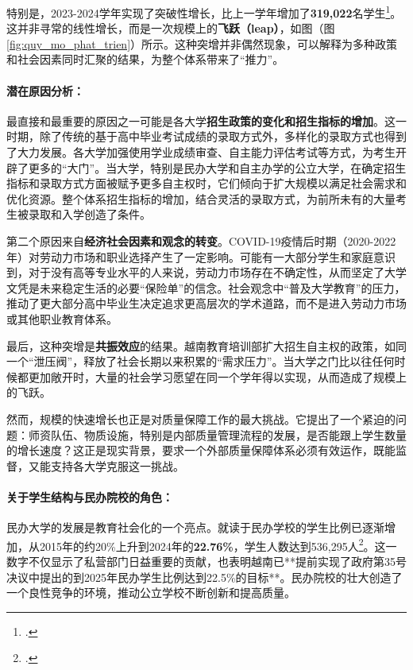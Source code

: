 特别是，2023-2024学年实现了突破性增长，比上一学年增加了\textbf{319,022}名学生\footcite{stat_moet_2024}。这并非寻常的线性增长，而是一次规模上的\textbf{飞跃（leap）}，如图（图\ref{fig:quy_mo_phat_trien}）所示。这种突增并非偶然现象，可以解释为多种政策和社会因素同时汇聚的结果，为整个体系带来了“推力”。

\paragraph{潜在原因分析：}
最直接和最重要的原因之一可能是各大学\textbf{招生政策的变化和招生指标的增加}。这一时期，除了传统的基于高中毕业考试成绩的录取方式外，多样化的录取方式也得到了大力发展。各大学加强使用学业成绩审查、自主能力评估考试等方式，为考生开辟了更多的“大门”。当大学，特别是民办大学和自主办学的公立大学，在确定招生指标和录取方式方面被赋予更多自主权时，它们倾向于扩大规模以满足社会需求和优化资源。整个体系招生指标的增加，结合灵活的录取方式，为前所未有的大量考生被录取和入学创造了条件。

第二个原因来自\textbf{经济社会因素和观念的转变}。COVID-19疫情后时期（2020-2022年）对劳动力市场和职业选择产生了一定影响。可能有一大部分学生和家庭意识到，对于没有高等专业水平的人来说，劳动力市场存在不确定性，从而坚定了大学文凭是未来稳定生活的必要“保险单”的信念。社会观念中“普及大学教育”的压力，推动了更大部分高中毕业生决定追求更高层次的学术道路，而不是进入劳动力市场或其他职业教育体系。

最后，这种突增是\textbf{共振效应}的结果。越南教育培训部扩大招生自主权的政策，如同一个“泄压阀”，释放了社会长期以来积累的“需求压力”。当大学之门比以往任何时候都更加敞开时，大量的社会学习愿望在同一个学年得以实现，从而造成了规模上的飞跃。

然而，规模的快速增长也正是对质量保障工作的最大挑战。它提出了一个紧迫的问题：师资队伍、物质设施，特别是内部质量管理流程的发展，是否能跟上学生数量的增长速度？这正是现实背景，要求一个外部质量保障体系必须有效运作，既能监督，又能支持各大学克服这一挑战。

\paragraph{关于学生结构与民办院校的角色：}
民办大学的发展是教育社会化的一个亮点。就读于民办学校的学生比例已逐渐增加，从2015年的约20\%上升到2024年的\textbf{22.76\%}，学生人数达到536,295人\footcite{stat_moet_2024}。这一数字不仅显示了私营部门日益重要的贡献，也表明越南已**提前实现了政府第35号决议中提出的到2025年民办学生比例达到22.5\%的目标**。民办院校的壮大创造了一个良性竞争的环境，推动公立学校不断创新和提高质量。

